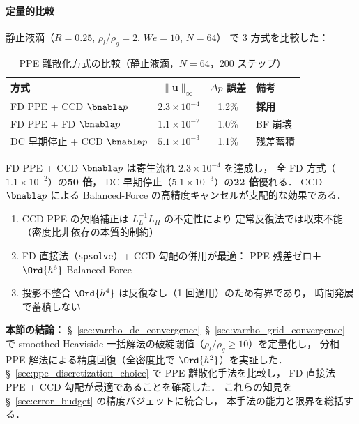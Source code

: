 \paragraph{定量的比較}

静止液滴（$R = 0.25$, $\rho_l/\rho_g = 2$, $\mathit{We} = 10$, $N = 64$）
で 3 方式を比較した：

\begin{table}[htbp]
\centering
\caption{PPE 離散化方式の比較（静止液滴，$N = 64$，200 ステップ）}
\label{tab:ppe_method_comparison}
\renewcommand{\arraystretch}{1.3}
\begin{tabular}{lccl}
\toprule
方式 & $\|\bm{u}\|_\infty$ & $\Delta p$ 誤差 & 備考 \\
\midrule
FD PPE + CCD $\bnabla p$ & $2.3 \times 10^{-4}$ & 1.2\% & \textbf{採用} \\
FD PPE + FD $\bnabla p$  & $1.1 \times 10^{-2}$ & 1.0\% & BF 崩壊 \\
DC 早期停止 + CCD $\bnabla p$ & $5.1 \times 10^{-3}$ & 1.1\% & 残差蓄積 \\
\bottomrule
\end{tabular}
\end{table}

\noindent
FD PPE + CCD $\bnabla p$ は寄生流れ $2.3 \times 10^{-4}$ を達成し，
全 FD 方式（$1.1 \times 10^{-2}$）の\textbf{50 倍}，
DC 早期停止（$5.1 \times 10^{-3}$）の\textbf{22 倍}優れる．
CCD $\bnabla p$ による Balanced-Force の高精度キャンセルが支配的な効果である．

\begin{tcolorbox}[resultbox, title={PPE 離散化の選択}]
\begin{enumerate}[noitemsep]
  \item CCD PPE の欠陥補正は $L_L^{-1} L_H$ の不定性により
        定常反復法では収束不能（密度比非依存の本質的制約）
  \item FD 直接法（\texttt{spsolve}）+ CCD 勾配の併用が最適：
        PPE 残差ゼロ＋$\Ord{h^6}$ Balanced-Force
  \item 投影不整合 $\Ord{h^4}$ は反復なし（1 回適用）のため有界であり，
        時間発展で蓄積しない
\end{enumerate}
\end{tcolorbox}

\noindent\textbf{本節の結論：}
§~\ref{sec:varrho_dc_convergence}--§~\ref{sec:varrho_grid_convergence} で
smoothed Heaviside 一括解法の破綻閾値（$\rho_l/\rho_g \geq 10$）を定量化し，
分相 PPE 解法による精度回復（全密度比で $\Ord{h^2}$）を実証した．
§~\ref{sec:ppe_discretization_choice} で PPE 離散化手法を比較し，
FD 直接法 PPE + CCD 勾配が最適であることを確認した．
これらの知見を §~\ref{sec:error_budget} の精度バジェットに統合し，
本手法の能力と限界を総括する．
